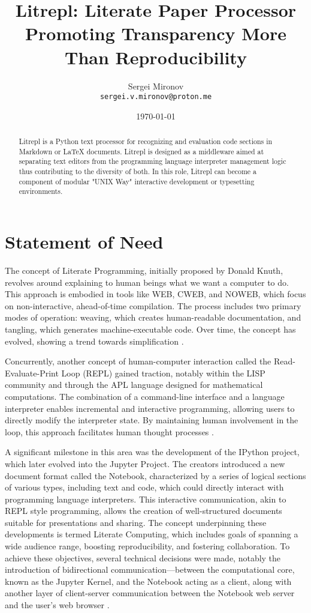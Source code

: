 \documentclass[a4paper,12pt,twocolumn]{article}
\title{Litrepl: Literate Paper Processor Promoting Transparency More Than Reproducibility}
\author{Sergei Mironov \\
        \texttt{sergei.v.mironov@proton.me}}
\date{\today}
\begin{document}
\maketitle

\begin{abstract}
Litrepl is a Python text processor for recognizing and evaluation code sections
in Markdown or LaTeX documents. Litrepl is designed as a middleware aimed at
separating text editors from the programming language interpreter management
logic thus contributing to the diversity of both. In this role, Litrepl can
become a component of modular "UNIX Way" interactive development or typesetting
environments.
\end{abstract}

\section{Statement of Need}

The concept of Literate Programming, initially proposed by Donald Knuth,
revolves around explaining to human beings what we want a computer to do. This
approach is embodied in tools like WEB, CWEB, and NOWEB, which focus on
non-interactive, ahead-of-time compilation. The process includes two primary
modes of operation: weaving, which creates human-readable documentation, and
tangling, which generates machine-executable code. Over time, the concept has
evolved, showing a trend towards simplification \cite{Knuth1984lp,
Ramsey1994lps}.

Concurrently, another concept of human-computer interaction called the
Read-Evaluate-Print Loop (REPL) gained traction, notably within the LISP
community and through the APL language designed for mathematical computations.
The combination of a command-line interface and a language interpreter enables
incremental and interactive programming, allowing users to directly modify the
interpreter state. By maintaining human involvement in the loop, this approach
facilitates human thought processes \cite{Spence1975apl, McCarthy1959recfun,
Iverson1962apl}.

A significant milestone in this area was the development of the IPython project,
which later evolved into the Jupyter Project. The creators introduced a new
document format called the Notebook, characterized by a series of logical
sections of various types, including text and code, which could directly
interact with programming language interpreters. This interactive communication,
akin to REPL style programming, allows the creation of well-structured documents
suitable for presentations and sharing. The concept underpinning these
developments is termed Literate Computing, which includes goals of spanning a
wide audience range, boosting reproducibility, and fostering collaboration. To
achieve these objectives, several technical decisions were made, notably the
introduction of bidirectional communication—between the computational core,
known as the Jupyter Kernel, and the Notebook acting as a client, along with
another layer of client-server communication between the Notebook web server and
the user’s web browser \cite{Perez2007IPython, Granger2021litcomp,
Kluyver2016jupnb}.
\end{document}
